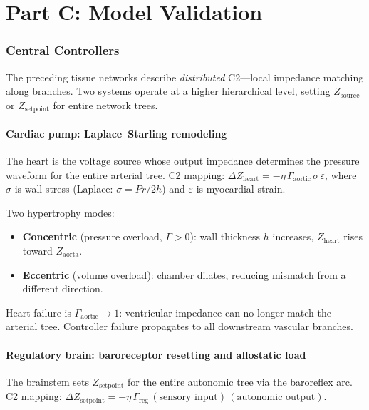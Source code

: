\documentclass[aps,pre,twocolumn,superscriptaddress,floatfix]{revtex4-2}
\begin{document}
\part*{Part C: Model Validation}



\section{Central Controllers}
\label{sec:controllers}

The preceding tissue networks describe \emph{distributed}
C2---local impedance matching along branches.
Two systems operate at a higher hierarchical level,
setting $Z_{\text{source}}$ or $Z_{\text{setpoint}}$
for entire network trees.

\subsection{Cardiac pump: Laplace--Starling remodeling}

The heart is the voltage source whose output impedance
determines the pressure waveform for the entire arterial
tree.  C2 mapping:
$\Delta Z_{\text{heart}} = -\eta\,\Gamma_{\text{aortic}}
\,\sigma\,\varepsilon$,
where $\sigma$ is wall stress (Laplace:
$\sigma = Pr/2h$) and $\varepsilon$ is myocardial strain.

Two hypertrophy modes:
\begin{itemize}
  \item \textbf{Concentric} (pressure overload,
    $\Gamma > 0$): wall thickness $h$ increases,
    $Z_{\text{heart}}$ rises toward $Z_{\text{aorta}}$.
  \item \textbf{Eccentric} (volume overload):
    chamber dilates, reducing mismatch from a
    different direction.
\end{itemize}
Heart failure is $\Gamma_{\text{aortic}} \to 1$:
ventricular impedance can no longer match the
arterial tree.  Controller failure propagates to
all downstream vascular branches.

\subsection{Regulatory brain: baroreceptor resetting and
allostatic load}

The brainstem sets $Z_{\text{setpoint}}$ for the
entire autonomic tree via the baroreflex arc.
C2 mapping:
$\Delta Z_{\text{setpoint}} = -\eta\,\Gamma_{\text{reg}}
\,(\text{sensory input})\,(\text{autonomic output})$.
\end{document}
